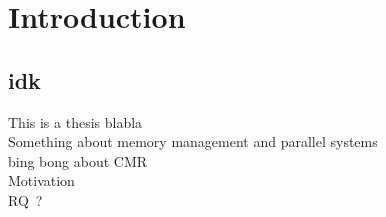 \chapter{Introduction}

\clearpage

\section{idk}

This is a thesis blabla
\\
Something about memory management and parallel systems
\\
bing bong about CMR
\\
Motivation
\\
RQ\ ?
